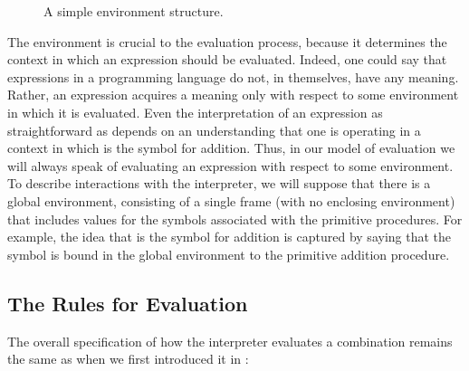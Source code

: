 \begin{figure}[tb]
\label{Figure 3.1}
\centering
\begin{comment}
\heading{Figure 3.1:} A simple environment structure.

\begin{example}
           +--------+
           |      I |
           | x: 3   |
           | y: 5   |
           +--------+
              ^  ^
              |  |
            C |  | D
+---------+   |  |   +----------+
|      II |   |  |   |      III |
| z: 6    +---+  +---+ m: 1     |
| x: 7    |          | y: 2     |
+---------+          +----------+
\end{example}
\end{comment}

\par\bigskip
\noindent
{} A simple environment structure.
\end{figure}

The environment is crucial to the evaluation process, because it determines the
context in which an expression should be evaluated.  Indeed, one could say that
expressions in a programming language do not, in themselves, have any meaning.
Rather, an expression acquires a meaning only with respect to some environment
in which it is evaluated.  Even the interpretation of an expression as
straightforward as  depends on an understanding that one is
operating in a context in which \code{+} is the symbol for addition.  Thus, in
our model of evaluation we will always speak of evaluating an expression with
respect to some environment.  To describe interactions with the interpreter, we
will suppose that there is a global environment, consisting of a single frame
(with no enclosing environment) that includes values for the symbols associated
with the primitive procedures.  For example, the idea that \code{+} is the
symbol for addition is captured by saying that the symbol \code{+} is bound in
the global environment to the primitive addition procedure.



\subsection{The Rules for Evaluation}
\label{Section 3.2.1}

The overall specification of how the interpreter evaluates a combination
remains the same as when we first introduced it in :

